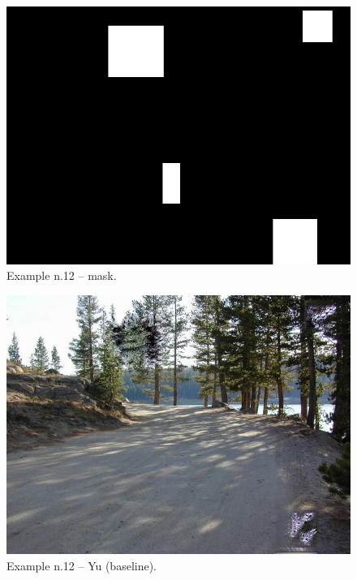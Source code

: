 \documentclass[a4paper, 11pt]{article}
\begin{document}
\begin{figure}
    \centering
    \includegraphics[width=.95\linewidth]{documentation/img/masks/0199_mask.png}
    \caption{Example n.12 -- mask.}
    \label{img:ex_n.12_mask}
\end{figure}
\begin{figure}
    \centering
    \includegraphics[width=.95\linewidth]{documentation/img/baseline/0199.png}
    \caption{Example n.12 -- Yu (baseline).}
    \label{img:ex_n.12_mask}
\end{figure}
\end{document}
